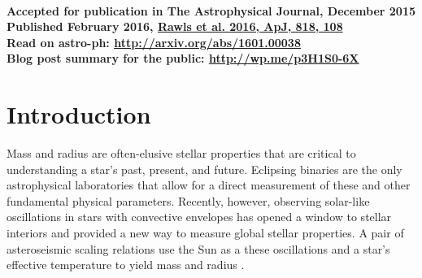 \textbf{\\ Accepted for publication in The Astrophysical Journal, December 2015 \\ Published February 2016, \href{http://iopscience.iop.org/article/10.3847/0004-637X/818/2/108}{Rawls et al. 2016, ApJ, 818, 108} \\ Read on astro-ph: \url{http://arxiv.org/abs/1601.00038} \\ Blog post summary for the public: \url{http://wp.me/p3H1S0-6X}} \\


\section{Introduction}\label{intro}


Mass and radius are often-elusive stellar properties that are critical to understanding a star's past, present, and future. Eclipsing binaries are the only astrophysical laboratories that allow for a direct measurement of these and other fundamental physical parameters. Recently, however, observing solar-like oscillations in stars with convective envelopes has opened a window to stellar interiors and provided a new way to measure global stellar properties. A pair of asteroseismic scaling relations use the Sun as a  these oscillations and a star's effective temperature to yield mass and radius \citep{kje95,hub10,mos13}.

